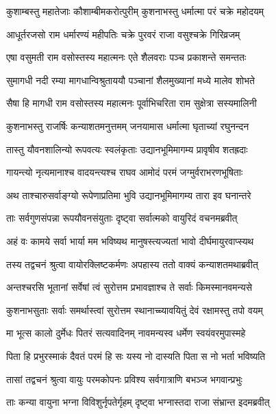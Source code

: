 \twolineshloka
{कुशाम्बस्तु महातेजाः कौशाम्बीमकरोत्पुरीम्}
{कुशनाभस्तु धर्मात्मा परं चक्रे महोदयम्} %

\twolineshloka
{आधूर्तरजसो राम धर्मारण्यं महीपतिः}
{चक्रे पुरवरं राजा वसुश्चक्रे गिरिव्रजम्} %

\twolineshloka
{एषा वसुमती राम वसोस्तस्य महात्मनः}
{एते शैलवराः पञ्च प्रकाशन्ते समन्ततः} %

\twolineshloka
{सुमागधी नदी रम्या मागधान्विश्रुताययौ}
{पञ्चानां शैलमुख्यानां मध्ये मालेव शोभते} %

\twolineshloka
{सैषा हि मागधी राम वसोस्तस्य महात्मनः}
{पूर्वाभिचरिता राम सुक्षेत्रा सस्यमालिनी} %

\twolineshloka
{कुशनाभस्तु राजर्षिः कन्याशतमनुत्तमम्}
{जनयामास धर्मात्मा घृताच्यां रघुनन्दन} %

\twolineshloka
{तास्तु यौवनशालिन्यो रूपवत्यः स्वलंकृताः}
{उद्यानभूमिमागम्य प्रावृषीव शतह्रदाः} %

\twolineshloka
{गायन्त्यो नृत्यमानाश्च वादयन्त्यश्च राघव}
{आमोदं परमं जग्मुर्वराभरणभूषिताः} %

\twolineshloka
{अथ ताश्चारुसर्वाङ्ग्यो रूपेणाप्रतिमा भुवि}
{उद्यानभूमिमागम्य तारा इव घनान्तरे} %

\twolineshloka
{ताः सर्वगुणसंपन्ना रूपयौवनसंयुताः}
{दृष्ट्वा सर्वात्मको वायुरिदं वचनमब्रवीत्} %

\twolineshloka
{अहं वः कामये सर्वा भार्या मम भविष्यथ}
{मानुषस्त्यज्यतां भावो दीर्घमायुरवाप्स्यथ} %

\twolineshloka
{तस्य तद्वचनं श्रुत्वा वायोरक्लिष्टकर्मणः}
{अपहास्य ततो वाक्यं कन्याशतमथाब्रवीत्} %

\twolineshloka
{अन्तश्चरसि भूतानां सर्वेषां त्वं सुरोत्तम}
{प्रभावज्ञाश्च ते सर्वाः किमस्मानवमन्यसे} %

\twolineshloka
{कुशनाभसुताः सर्वाः समर्थास्त्वां सुरोत्तम}
{स्थानाच्च्यावयितुं देवं रक्षामस्तु तपो वयम्} %

\twolineshloka
{मा भूत्स कालो दुर्मेधः पितरं सत्यवादिनम्}
{नावमन्यस्व धर्मेण स्वयंवरमुपास्महे} %

\twolineshloka
{पिता हि प्रभुरस्माकं दैवतं परमं हि सः}
{यस्य नो दास्यति पिता स नो भर्ता भविष्यति} %

\twolineshloka
{तासां तद्वचनं श्रुत्वा वायुः परमकोपनः}
{प्रविश्य सर्वगात्राणि बभञ्ज भगवान्प्रभुः} %

\twolineshloka
{ताः कन्या वायुना भग्ना विविशुर्नृपतेर्गृहम्}
{दृष्ट्वा भग्नास्तदा राजा संभ्रान्त इदमब्रवीत्} %

